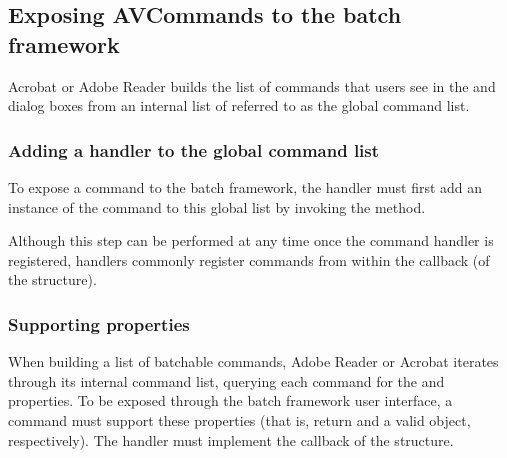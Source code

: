 \documentclass[letterpaper,12pt,english,openany,oneside]{sphinxmanual}
\begin{document}
\subsection{Exposing AVCommands to the batch framework}
\label{\detokenize{Plugins_Handlers:exposing-avcommands-to-the-batch-framework}}
Acrobat or Adobe Reader builds the list of commands that users see in the  and  dialog boxes from an internal list of  referred to as the global command list.


\subsubsection{Adding a handler to the global command list}
\label{\detokenize{Plugins_Handlers:adding-a-handler-to-the-global-command-list}}
To expose a command to the batch framework, the  handler must first add an instance of the command to this global list by invoking the  method.

\begin{sphinxVerbatim}[commandchars=\\\{\}]
   
\end{sphinxVerbatim}

Although this step can be performed at any time once the command handler is registered, handlers commonly register commands from within the  callback (of the  structure).


\subsubsection{Supporting properties}
\label{\detokenize{Plugins_Handlers:supporting-properties}}
When building a list of batchable commands, Adobe Reader or Acrobat iterates through its internal command list, querying each command for the  and  properties. To be exposed through the batch framework user interface, a command must support these properties (that is, return  and a valid  object, respectively). The  handler must implement the  callback of the  structure.
\end{document}
